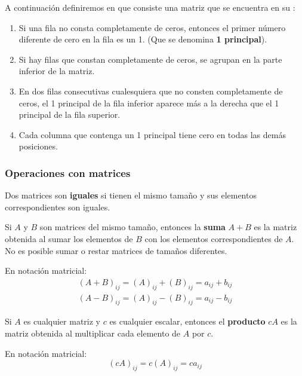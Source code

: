 \documentclass[a4paper,12pt]{article}
\begin{document}
A continuación definiremos en que consiste una matriz que se encuentra en su
:
\begin{concept}[i]
  \begin{enumerate}
    \item Si una fila no consta completamente de ceros, entonces el primer
      número diferente de cero en la fila es un 1. (Que se denomina
      \textbf{1 principal}).
    \item Si hay filas que constan completamente de ceros, se agrupan en
      la parte inferior de la matriz.
    \item En dos filas consecutivas cualesquiera que no consten completamente
      de ceros, el 1 principal de la fila inferior aparece más a la derecha
      que el 1 principal de la fila superior.
    \item Cada columna que contenga un 1 principal tiene cero en todas las
      demás posiciones.
  \end{enumerate}
\end{concept}

\subsubsection{Operaciones con matrices}

\begin{concept}[i]
  Dos matrices son \textbf{iguales} si tienen el mismo tamaño y sus elementos
  correspondientes son iguales.
\end{concept}

\begin{concept}[i]
  Si $A$ y $B$ son matrices del mismo tamaño, entonces la \textbf{suma}
  $A+B$ es la matriz obtenida al sumar los elementos de $B$ con los elementos
  correspondientes de $A$. No es posible sumar o restar matrices de tamaños
  diferentes.
\end{concept}
En notación matricial:
  \begin{align*}
    (A+B)_{ij} = (A)_{ij} + (B)_{ij} = a_{ij} + b_{ij} \\
    (A-B)_{ij} = (A)_{ij} - (B)_{ij} = a_{ij} - b_{ij}
  \end{align*}

\begin{concept}[i]
  Si $A$ es cualquier matriz y $c$ es cualquier escalar, entonces el
  \textbf{producto} $cA$ es la matriz obtenida al multiplicar cada elemento de
  $A$ por $c$.
\end{concept}
En notación matricial:
\begin{equation*}
  (cA)_{ij} = c(A)_{ij} = ca_{ij}
\end{equation*}
\end{document}
